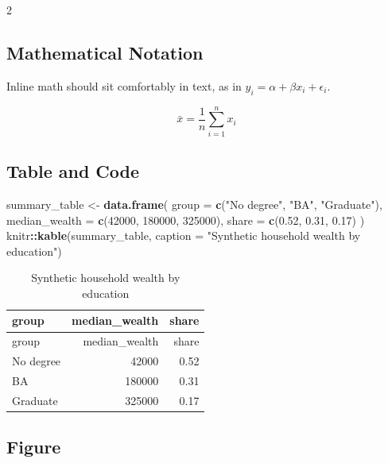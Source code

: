 \documentclass[12pt]{article}
\newenvironment{Shaded}{\begin{snugshade}}{\end{snugshade}}
\newcommand{\AttributeTok}[1]{\textcolor[rgb]{0.13,0.29,0.53}{#1}}
\newcommand{\DecValTok}[1]{\textcolor[rgb]{0.00,0.00,0.81}{#1}}
\newcommand{\FloatTok}[1]{\textcolor[rgb]{0.00,0.00,0.81}{#1}}
\newcommand{\FunctionTok}[1]{\textcolor[rgb]{0.13,0.29,0.53}{\textbf{#1}}}
\newcommand{\NormalTok}[1]{#1}
\newcommand{\OtherTok}[1]{\textcolor[rgb]{0.56,0.35,0.01}{#1}}
\newcommand{\SpecialCharTok}[1]{\textcolor[rgb]{0.81,0.36,0.00}{\textbf{#1}}}
\newcommand{\StringTok}[1]{\textcolor[rgb]{0.31,0.60,0.02}{#1}}
\renewenvironment{Shaded}{%
    \vspace{3pt}%
    \noindent\begin{minipage}{\linewidth}%
    \def\FrameCommand{%
      \hspace{1pt}%
      {\color{docdesignerrule}\vrule width 3pt}%
      \hspace{4pt}%
      \colorbox{codeinputbg}%
    }%
    \MakeFramed{\advance\hsize by -\width \FrameRestore}%
    \footnotesize
    \setlength{\parskip}{0pt}%
    \setlength{\partopsep}{0pt}%
  }{%
    \endMakeFramed
    \end{minipage}%
    \vspace{3pt}%
  }
\def\FrameCommand{\fboxsep=4pt\colorbox{codeoutputbg}}%
\begin{document}
\begin{multicols}{2}
\subsection{Mathematical Notation}\label{mathematical-notation}

Inline math should sit comfortably in text, as in
\(y_i = \alpha + \beta x_i + \epsilon_i\).

\[
\bar{x} = \frac{1}{n}\sum_{i=1}^{n} x_i
\]

\subsection{Table and Code}\label{table-and-code}

\begin{Shaded}
\begin{Highlighting}[]
\NormalTok{summary\_table }\OtherTok{\textless{}{-}} \FunctionTok{data.frame}\NormalTok{(}
  \AttributeTok{group =} \FunctionTok{c}\NormalTok{(}\StringTok{"No degree"}\NormalTok{, }\StringTok{"BA"}\NormalTok{, }\StringTok{"Graduate"}\NormalTok{),}
  \AttributeTok{median\_wealth =} \FunctionTok{c}\NormalTok{(}\DecValTok{42000}\NormalTok{, }\DecValTok{180000}\NormalTok{, }\DecValTok{325000}\NormalTok{),}
  \AttributeTok{share =} \FunctionTok{c}\NormalTok{(}\FloatTok{0.52}\NormalTok{, }\FloatTok{0.31}\NormalTok{, }\FloatTok{0.17}\NormalTok{)}
\NormalTok{)}
\NormalTok{knitr}\SpecialCharTok{::}\FunctionTok{kable}\NormalTok{(summary\_table, }\AttributeTok{caption =} \StringTok{"Synthetic household wealth by education"}\NormalTok{)}
\end{Highlighting}
\end{Shaded}

\begin{longtable}[]{@{}lrr@{}}
\caption{Synthetic household wealth by education}\tabularnewline
\toprule\noalign{}
group & median\_wealth & share \\
\midrule\noalign{}
\endfirsthead
\toprule\noalign{}
group & median\_wealth & share \\
\midrule\noalign{}
\endhead
\bottomrule\noalign{}
\endlastfoot
No degree & 42000 & 0.52 \\
BA & 180000 & 0.31 \\
Graduate & 325000 & 0.17 \\
\end{longtable}

\subsection{Figure}\label{figure}


\end{multicols}
\end{document}
